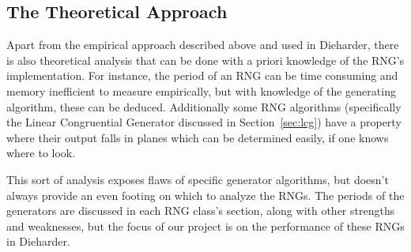 \subsection{The Theoretical Approach}
\label{sec:theoretical}

Apart from the empirical approach described above and used in Dieharder, there is also theoretical analysis that can be done with a priori knowledge of the RNG's implementation. For instance, the period of an RNG can be time consuming and memory inefficient to measure empirically, but with knowledge of the generating algorithm, these can be deduced. Additionally some RNG algorithms (specifically the Linear Congruential Generator discussed in Section~\ref{sec:lcg}) have a property where their output falls in planes which can be determined easily, if one knows where to look.

This sort of analysis exposes flaws of specific generator algorithms, but doesn't always provide an even footing on which to analyze the RNGs. The periods of the generators are discussed in each RNG class's section, along with other strengths and weaknesses, but the focus of our project is on the performance of these RNGs in Dieharder.
